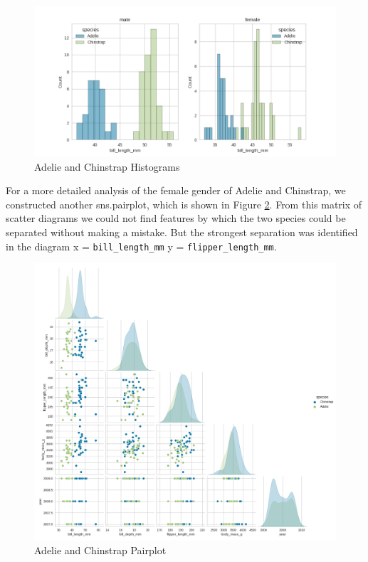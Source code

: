 \documentclass[12pt,a4paper]{article}
\begin{document}
\begin{figure}[h]
	\centering
	\includegraphics[width=1.0\linewidth]{fig_adelie_chinstrap}
	\caption{Adelie and Chinstrap Histograms}
	\label{fig:adelieandchinstrap}
\end{figure}

For a more detailed analysis of the female gender of Adelie and Chinstrap, we constructed another sns.pairplot, which is shown in Figure \ref{fig:adelieandchinstrappairplot}.
From this matrix of scatter diagrams we could not find features by which the two species could be separated without making a mistake. But the strongest separation was identified in the diagram x = \texttt{bill\_length\_mm} y = \texttt{flipper\_length\_mm}.


\begin{figure}[h]
	\centering
	\includegraphics[width=1.0\linewidth]{fig_adelie_chinstrap2}
	\caption{Adelie and Chinstrap Pairplot}
	\label{fig:adelieandchinstrappairplot}
\end{figure}
\end{document}
